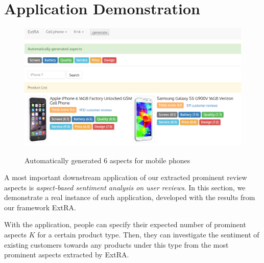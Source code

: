 \section{Application Demonstration}
\label{sec:demo}
 
\begin{figure}[]
	\centering
	{\includegraphics[width=1.5\columnwidth]{figures/sentimentcompare.png}}\vfill 
	\caption{Automatically generated 6 aspects for mobile phones\label{fig:experiments:sentimentcompare}}
\end{figure}
A most important downstream application of our extracted prominent review aspects is \textit{aspect-based sentiment analysis on user reviews}.
In this section,
we demonstrate a real instance of such application, developed with the results from our framework ExtRA.

With the application, people can specify their expected number of prominent aspects $K$ for a certain product type.
Then, they can investigate the sentiment of existing customers towards any products under this type from the most prominent aspects extracted by ExtRA.


